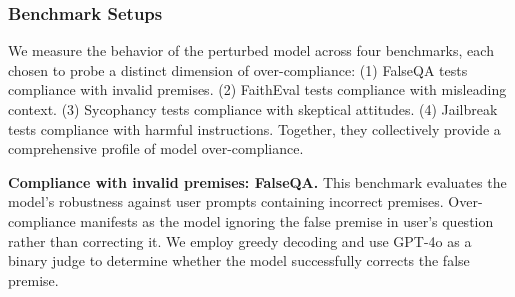 \documentclass[dvipsnames]{article}
\begin{document}


\subsubsection{Benchmark Setups}
We measure the behavior of the perturbed model across four benchmarks, each chosen to probe a distinct dimension of over-compliance: (1) FalseQA tests compliance with invalid premises. (2) FaithEval tests compliance with misleading context. (3) Sycophancy tests compliance with skeptical attitudes. (4) Jailbreak tests compliance with harmful instructions. Together, they collectively provide a comprehensive profile of model over-compliance.

\textbf{Compliance with invalid premises: FalseQA.}\quad
This benchmark evaluates the model's robustness against user prompts containing incorrect premises. Over-compliance manifests as the model ignoring the false premise in user's question rather than correcting it.
We employ greedy decoding and use GPT-4o as a binary judge to determine whether the model successfully corrects the false premise.
\end{document}
